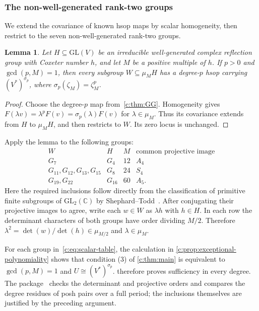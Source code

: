 \documentclass[10pt,a4paper]{amsart}
\newtheorem{lemma}[theorem]{Lemma}
\theoremstyle{definition}
\newcommand{\C}{\mathbb C}\newcommand{\Q}{\mathbb Q}
\begin{document}
\subsubsection{The non-well-generated rank-two groups}\label{c:sec:scalar}

We extend the covariance of known hsop maps by scalar homogeneity,
then restrict to the seven non-well-generated rank-two groups.

\begin{lemma}\label{c:lem:scalar}
Let $H\subseteq\mathrm{GL}(V)$ be an irreducible well-generated complex
reflection group with Coxeter number $h$, and let $M$ be a positive
multiple of $h$. If $p>0$ and $\gcd(p,M)=1$, then
every subgroup $W\subseteq\mu_M H$ has a degree-$p$ hsop carrying
$(V^*)^{\sigma_p}$, where $\sigma_p(\zeta_M)=\zeta_M^p$.
\end{lemma}

\begin{proof}
Choose the degree-$p$ map from~\cref{c:thm:GG}. Homogeneity gives
$F(\lambda v)=\lambda^pF(v)=\sigma_p(\lambda)F(v)$ for
$\lambda\in\mu_M$. Thus its covariance extends from $H$ to
$\mu_M H$, and then restricts to $W$. Its zero locus is unchanged.
\end{proof}

Apply the lemma to the following groups:
\begin{equation}\label{c:eq:scalar-table}
\begin{array}{c|c|c|c}
 W&H&M&\text{common projective image}\\\hline
 G_7&G_4&12&A_4\\
 G_{11},G_{12},G_{13},G_{15}&G_8&24&S_4\\
 G_{19},G_{22}&G_{16}&60&A_5.
\end{array}
\end{equation}
Here the required inclusions follow directly from the classification of
primitive finite subgroups of $\mathrm{GL}_2(\C)$ by
Shephard--Todd~\cite{ST}. After
conjugating their projective images to agree, write each $w\in W$ as
$\lambda h$ with $h\in H$. In each row the determinant characters of
both groups have order dividing $M/2$. Therefore
$\lambda^2=\det(w)/\det(h)\in\mu_{M/2}$ and $\lambda\in\mu_M$.

For each group in~\cref{c:eq:scalar-table}, the calculation in
\cref{c:prop:exceptional-polynomiality} shows that condition (3) of \cref{c:thm:main}
is equivalent to $\gcd(p,M)=1$ and $U\cong(V^*)^{\sigma_p}$.
 therefore proves sufficiency in every degree.
The package~\cite{Computations} checks the determinant and projective
orders and compares the degree residues of posh pairs over a full period; the
inclusions themselves are justified by the preceding argument.
\end{document}
